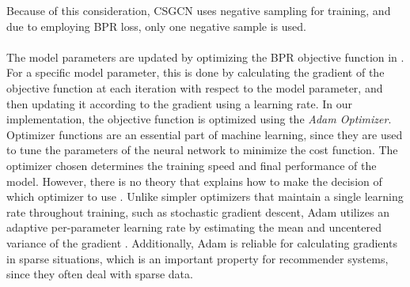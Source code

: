 Because of this consideration, CSGCN uses negative sampling for training, and due to employing BPR loss, only one negative sample is used.
\\\\
The model parameters are updated by optimizing the BPR objective function in .
For a specific model parameter, this is done by calculating the gradient of the objective function at each iteration with respect to the model parameter, and then updating it according to the gradient using a learning rate. 
In our implementation, the objective function is optimized using the \textit{Adam Optimizer}\cite{AdamOptimizer}.
Optimizer functions are an essential part of machine learning, since they are used to tune the parameters of the neural network to minimize the cost function.
The optimizer chosen determines the training speed and final performance of the model.
However, there is no theory that explains how to make the decision of which optimizer to use \cite{EmpiricalOptimizers}.
Unlike simpler optimizers that maintain a single learning rate throughout training,  such as stochastic gradient descent, Adam utilizes an adaptive per-parameter learning rate by estimating the mean and uncentered variance of the gradient \cite{AdamOptimizer}.
Additionally, Adam is reliable for calculating gradients in sparse situations, which is an important property for recommender systems, since they often deal with sparse data.






